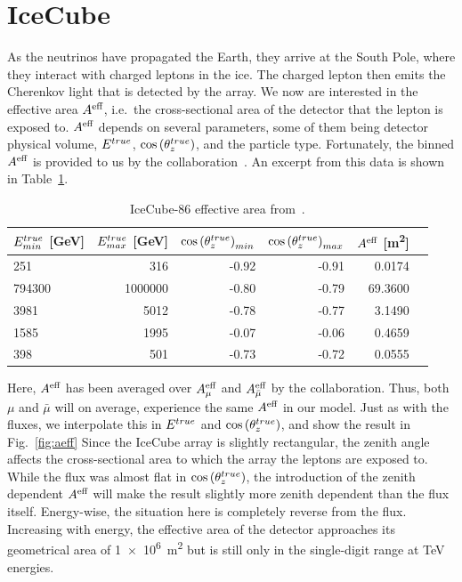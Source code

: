% 
% 

\section{IceCube}\label{ch:ICmethod}
As the neutrinos have propagated the Earth, they arrive at the South Pole, where they interact with charged leptons in the ice. The charged lepton then emits the Cherenkov light that is detected by the array.
We now are interested in the effective area $A^\text{eff}$, 
i.e.~the cross-sectional area of the detector that the lepton is exposed to.
$A^\text{eff}$ depends on several parameters, some of them being detector physical volume, $E^{true}$, $\cos{(\theta_z^{true})}$, and the particle type. 
Fortunately, the binned $A^\text{eff}$ is provided to us by the collaboration~\cite{ICaeff}.
An excerpt from this data is shown in Table~\ref{table:aeff}.

\begin{table}[ht]
    \centering
    \begin{tabular}{lrrrrr}
        \hline \hline
        $E^{true}_{min}$ [\si{\GeV}] &     $E^{true}_{max}$ [\si{\GeV}]&   $\cos{(\theta_z^{true})}_{min}$ &   $\cos{(\theta_z^{true})}_{max}$ &     $A^\text{eff}$ [\si{\metre\squared}] \\
        \hline
             251 &      316 &  -0.92 &  -0.91 &   0.0174 \\
          794300 &  1000000 &  -0.80 &  -0.79 &  69.3600 \\
            3981 &     5012 &  -0.78 &  -0.77 &   3.1490 \\
            1585 &     1995 &  -0.07 &  -0.06 &   0.4659 \\
            398 &      501 &  -0.73 &  -0.72 &   0.0555 \\
        \hline \hline
        \end{tabular}
    \caption{IceCube-86 effective area from~\cite{ICaeff}.}
    \label{table:aeff}
\end{table}

Here, $A^\text{eff}$ has been averaged over $A^\text{eff}_\mu$ and $A^\text{eff}_{\bar{\mu}}$ by the collaboration. Thus, both $\mu$ and $\bar\mu$ will on average, experience the same $A^\text{eff}$ in our model. 
Just as with the fluxes, we interpolate this in $E^{true}$ and $\cos{(\theta_z^{true})}$, and show the result in Fig.~\ref{fig:aeff}
Since the IceCube array is slightly rectangular, the zenith angle affects the cross-sectional area to which the array the leptons are exposed to.
While the flux was almost flat in $\cos{(\theta_z^{true})}$, the introduction of the zenith dependent $A^\text{eff}$ will make the result slightly more zenith dependent than the flux itself. Energy-wise, the situation here is completely reverse from the flux. Increasing with energy, the effective area of the detector approaches its geometrical area of \SI{1e6}{\metre^2} but is still only in the single-digit range at \si{\TeV} energies.

